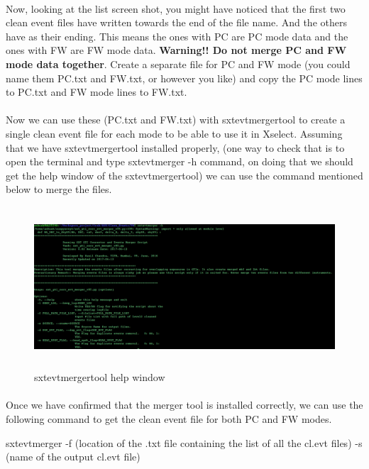 \documentclass[a4paper,twoside]{report}
\numberwithin{equation}{section}
\begin{document}
\paragraph{}
Now, looking at the list screen shot, you might have noticed that the first two clean event files have  written towards the end of the file name. And the others have  as their ending. This means the ones with PC are PC mode data and the ones with FW are FW mode data. {\large \textbf{Warning!! Do not merge PC and FW mode data together}}. Create a separate file for PC and FW mode (you could name them PC.txt and FW.txt, or however you like) and copy the PC mode lines to PC.txt and FW mode lines to FW.txt.
\paragraph{}
Now we can use these (PC.txt and FW.txt) with sxtevtmergertool to create a single clean event file for each mode to be able to use it in Xselect. Assuming that we have sxtevtmergertool installed properly, (one way to check that is to open the terminal and type sxtevtmerger -h command, on doing that we should get the help window of the sxtevtmergertool) we can use the command mentioned below to merge the files. 
\begin{figure}[h]
\includegraphics[width=1.0\linewidth, height=6cm]{sxtevtmergertool.jpg}
\caption{sxtevtmergertool help window}
\label{sxtevtmerger_help}
\end{figure}
\paragraph{}
Once we have confirmed that the merger tool is installed correctly, we can use the following command to get the clean event file for both PC and FW modes. 
\begin{center}
\item sxtevtmerger -f (location of the .txt file containing the list of all the cl.evt files) -s (name of the output cl.evt file)
\end{center}
\end{document}
